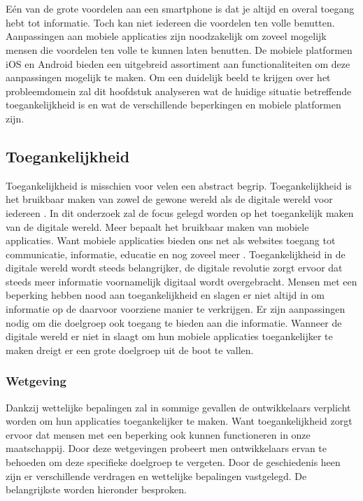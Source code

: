 \chapter{}
\label{ch:stand-van-zaken}
Eén van de grote voordelen aan een smartphone is dat je altijd en overal toegang hebt tot informatie. Toch kan niet iedereen die voordelen ten volle benutten. Aanpassingen aan mobiele applicaties zijn noodzakelijk om zoveel mogelijk mensen die voordelen ten volle te kunnen laten benutten. De mobiele platformen iOS en Android bieden een uitgebreid assortiment aan functionaliteiten om deze aanpassingen mogelijk te maken. Om een duidelijk beeld te krijgen over het probleemdomein zal dit hoofdstuk analyseren wat de huidige situatie betreffende toegankelijkheid is en wat de verschillende beperkingen en mobiele platformen zijn.



\section{Toegankelijkheid}
\label{sec:toegankelijkheid}
Toegankelijkheid is misschien voor velen een abstract begrip. Toegankelijkheid is het bruikbaar maken van zowel de gewone wereld als de digitale wereld voor iedereen \autocite{anySurferWat}. In dit onderzoek zal de focus gelegd worden op het toegankelijk maken van de digitale wereld. Meer bepaalt het bruikbaar maken van mobiele applicaties. Want mobiele applicaties bieden ons net als websites toegang tot communicatie, informatie, educatie en nog zoveel meer  \autocite{introAccesibilityw3c}. Toegankelijkheid in de digitale wereld wordt steeds belangrijker, de digitale revolutie zorgt ervoor dat steeds meer informatie voornamelijk digitaal wordt overgebracht. Mensen met een beperking hebben nood aan toegankelijkheid en slagen er niet altijd in om informatie op de daarvoor voorziene manier te verkrijgen. Er zijn aanpassingen nodig om die doelgroep ook toegang te bieden aan die informatie. Wanneer de digitale wereld er niet in slaagt om hun mobiele applicaties toegankelijker te maken dreigt er een grote doelgroep uit de boot te vallen.







\subsection{Wetgeving}
\label{sec:wetgeving}
Dankzij wettelijke bepalingen zal in sommige gevallen de ontwikkelaars verplicht worden om
hun applicaties toegankelijker te maken. Want toegankelijkheid zorgt ervoor dat mensen
met een beperking ook kunnen functioneren in onze maatschappij. Door deze wetgevingen probeert men ontwikkelaars ervan te behoeden om deze specifieke doelgroep te vergeten.
Door de geschiedenis heen zijn er verschillende verdragen en wettelijke bepalingen vastgelegd.
De belangrijkste worden hieronder besproken.

